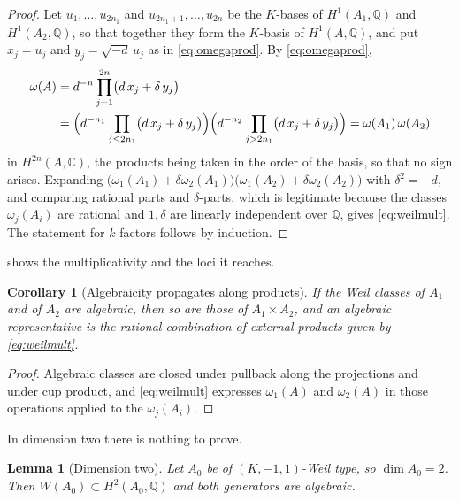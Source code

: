 \documentclass[11pt,reqno]{amsart}
\theoremstyle{plain}
\newtheorem{lemma}[theorem]{Lemma}
\newtheorem{corollary}[theorem]{Corollary}
\theoremstyle{definition}
\theoremstyle{remark}
\newcommand{\QQ}{\mathbb{Q}}
\newcommand{\CC}{\mathbb{C}}
\newcommand{\HW}{W}                      %
\begin{document}
\begin{proof}
Let $u_{1},\dots,u_{2n_{1}}$ and $u_{2n_{1}+1},\dots,u_{2n}$ be the
$K$-bases of $H^{1}(A_{1},\QQ)$ and $H^{1}(A_{2},\QQ)$, so that together they
form the $K$-basis of $H^{1}(A,\QQ)$, and put $x_{j}=u_{j}$ and
$y_{j}=\sqrt{-d}\,u_{j}$ as in \eqref{eq:omegaprod}. By \eqref{eq:omegaprod},
\[
\begin{aligned}
  \omega(A)
  &=d^{-n}\prod_{j=1}^{2n}\bigl(d\,x_{j}+\delta\,y_{j}\bigr)\\
  &=\Bigl(d^{-n_{1}}\prod_{j\le2n_{1}}\bigl(d\,x_{j}+\delta\,y_{j}\bigr)\Bigr)
   \Bigl(d^{-n_{2}}\prod_{j>2n_{1}}\bigl(d\,x_{j}+\delta\,y_{j}\bigr)\Bigr)
  =\omega(A_{1})\,\omega(A_{2})
\end{aligned}
\]
in $H^{2n}(A,\CC)$, the products being taken in the order of the basis, so
that no sign arises. Expanding
$\bigl(\omega_{1}(A_{1})+\delta\omega_{2}(A_{1})\bigr)
\bigl(\omega_{1}(A_{2})+\delta\omega_{2}(A_{2})\bigr)$ with $\delta^{2}=-d$,
and comparing rational parts and $\delta$-parts, which is legitimate because
the classes $\omega_{j}(A_{i})$ are rational and $1,\delta$ are linearly
independent over $\QQ$, gives \eqref{eq:weilmult}. The statement for $k$
factors follows by induction.
\end{proof}

 shows the multiplicativity and the loci it reaches.

\begin{corollary}[Algebraicity propagates along products]\label{cor:prodalg}
If the Weil classes of $A_{1}$ and of $A_{2}$ are algebraic, then so are those
of $A_{1}\times A_{2}$, and an algebraic representative is the rational
combination of external products given by \eqref{eq:weilmult}.
\end{corollary}

\begin{proof}
Algebraic classes are closed under pullback along the projections and under
cup product, and \eqref{eq:weilmult} expresses $\omega_{1}(A)$ and
$\omega_{2}(A)$ in those operations applied to the $\omega_{j}(A_{i})$.
\end{proof}

In dimension two there is nothing to prove.

\begin{lemma}[Dimension two]\label{lem:basecase}
Let $A_{0}$ be of $(K,-1,1)$-Weil type, so $\dim A_{0}=2$. Then
$\HW(A_{0})\subset H^{2}(A_{0},\QQ)$ and both generators are algebraic.
\end{lemma}
\end{document}
